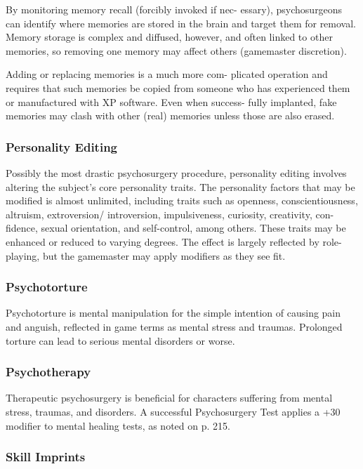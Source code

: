 By monitoring memory recall (forcibly invoked if nec-
essary), psychosurgeons can identify where memories 
are stored in the brain and target them for removal. 
Memory storage is complex and diffused, however, 
and often linked to other memories, so removing one 
memory may affect others (gamemaster discretion).

Adding or replacing memories is a much more com-
plicated operation and requires that such memories be 
copied from someone who has experienced them or 
manufactured with XP software. Even when success-
fully implanted, fake memories may clash with other 
(real) memories unless those are also erased.

\subsubsection{Personality Editing}

Possibly the most drastic psychosurgery procedure, 
personality editing involves altering the subject's core 
personality traits. The personality factors that may be 
modified is almost unlimited, including traits such as 
openness, conscientiousness, altruism, extroversion/
introversion, impulsiveness, curiosity, creativity, con-
fidence, sexual orientation, and self-control, among 
others. These traits may be enhanced or reduced to 
varying degrees. The effect is largely reflected by role-
playing, but the gamemaster may apply modifiers as 
they see fit.

\subsubsection{Psychotorture}

Psychotorture is mental manipulation for the simple 
intention of causing pain and anguish, reflected  in 
game terms as mental stress and traumas. Prolonged 
torture can lead to serious mental disorders or worse.

\subsubsection{Psychotherapy}

Therapeutic psychosurgery is beneficial for characters 
suffering from mental stress, traumas, and disorders. A 
successful Psychosurgery Test applies a +30 modifier 
to mental healing tests, as noted on p. 215.

\subsubsection{Skill Imprints}

